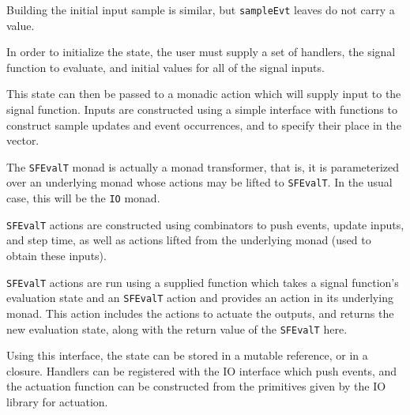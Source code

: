 Building the initial input sample is similar, but {\tt sampleEvt} leaves do
not carry a value.

In order to initialize the state, the user must supply a set of handlers, the
signal function to evaluate, and initial values for all of the signal inputs.

This state can then be passed to a monadic action which will supply input to
the signal function. Inputs are constructed using a simple interface with
functions to construct sample updates and event occurrences, and to specify
their place in the vector.

The {\tt SFEvalT} monad is actually a monad transformer, that is, it is
parameterized over an underlying monad whose actions may be lifted to
{\tt SFEvalT}. In the usual case, this will be the {\tt IO} monad.

{\tt SFEvalT} actions are constructed using combinators to push events,
update inputs, and step time, as well as actions lifted from the underlying
monad (used to obtain these inputs). 

{\tt SFEvalT} actions are run using a supplied function which takes a signal
function's evaluation state and an {\tt SFEvalT} action and provides an action
in its underlying monad. This action includes the actions to actuate the outputs,
and returns the new evaluation state, along with the return value of the
{\tt SFEvalT} here.

Using this interface, the state can be stored in a mutable reference, or in a
closure. Handlers can be registered with the IO interface which push events, and
the actuation function can be constructed from the primitives given by the IO
library for actuation.
